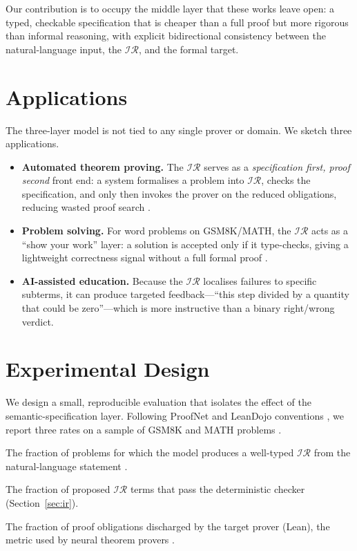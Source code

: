 \documentclass[11pt]{article}
\newcommand{\IR}{\ensuremath{\mathcal{IR}}}
\begin{document}
Our contribution is to occupy the middle layer that these works leave open:
a typed, checkable specification that is cheaper than a full proof but more
rigorous than informal reasoning, with explicit bidirectional consistency
between the natural-language input, the \IR{}, and the formal target.

\section{Applications}
\label{sec:applications}

The three-layer model is not tied to any single prover or domain. We sketch
three applications.

\begin{itemize}
\item \textbf{Automated theorem proving.} The \IR{} serves as a
\emph{specification first, proof second} front end: a system formalises a
problem into \IR{}, checks the specification, and only then invokes the prover
on the reduced obligations, reducing wasted proof search
\citep{yang2023leandojo}.
\item \textbf{Problem solving.} For word problems on GSM8K/MATH, the \IR{}
acts as a ``show your work'' layer: a solution is accepted only if it
type-checks, giving a lightweight correctness signal without a full formal
proof \citep{cobbe2021training, hendrycks2021measuring}.
\item \textbf{AI-assisted education.} Because the \IR{} localises failures to
specific subterms, it can produce targeted feedback---``this step divided by a
quantity that could be zero''---which is more instructive than a binary
right/wrong verdict.
\end{itemize}
\section{Experimental Design}
\label{sec:experiments}

We design a small, reproducible evaluation that isolates the effect of the
semantic-specification layer. Following ProofNet and LeanDojo conventions
\citep{azerbayev2023proofnet, yang2023leandojo}, we report three rates on a
sample of GSM8K and MATH problems
\citep{cobbe2021training, hendrycks2021measuring}.

\begin{description}[leftmargin=2.2em]
\item[Autoformalization rate.] The fraction of problems for which the model
produces a well-typed \IR{} from the natural-language statement
\citep{wu2022autoformalization}.
\item[Type-check rate.] The fraction of proposed \IR{} terms that pass the
deterministic checker (Section~\ref{sec:ir}).
\item[Proof rate.] The fraction of proof obligations discharged by the target
prover (Lean), the metric used by neural theorem provers
\citep{wang2023legoprover, yang2023leandojo}.
\end{description}
\end{document}
